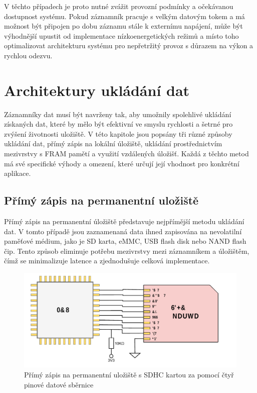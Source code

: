 V těchto případech je proto nutné zvážit provozní podmínky a očekávanou dostupnost systému. Pokud záznamník pracuje s velkým datovým tokem a má možnost být připojen po dobu záznamu stále k externímu napájení, může být výhodnější upustit od implementace nízkoenergetických režimů a místo toho optimalizovat architekturu systému pro nepřetržitý provoz s důrazem na výkon a rychlou odezvu. \cite{analog_devices_low_power_modes}


\section{Architektury ukládání dat}
Záznamníky dat musí být navrženy tak, aby umožnily spolehlivé ukládání získaných dat, které by mělo být efektivní ve smyslu rychlosti a šetrné pro zvýšení životnosti uložiště. V této kapitole jsou popsány tři různé způsoby ukládání dat, přímý zápis na lokální úložiště, ukládání prostřednictvím mezivrstvy s FRAM pamětí a využití vzdálených úložišť. Každá z těchto metod má své specifické výhody a omezení, které určují její vhodnost pro konkrétní aplikace.

\subsection{Přímý zápis na permanentní uložiště}
Přímý zápis na permanentní úložiště představuje nejpřímější metodu ukládání dat. V tomto případě jsou zaznamenaná data ihned zapisována na nevolatilní paměťové médium, jako je SD karta, eMMC, USB flash disk nebo NAND flash čip. Tento způsob eliminuje potřebu mezivrstvy mezi záznamníkem a úložištěm, čímž se minimalizuje latence a zjednodušuje celková implementace.

\begin{figure}[h]
    \centering
    \includegraphics[width=1.00\textwidth]{obrazky-figures/forward_write.pdf}
    
    \caption{Přímý zápis na permanentní uložiště s SDHC kartou za pomocí čtyř pinové datové sběrnice}
    \label{fig:forward-write}
\end{figure}

